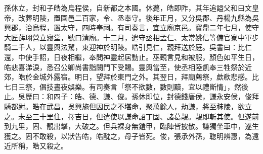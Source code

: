 \begin{pinyinscope}
孫休立，封和子皓為烏程侯，自新都之本國。休薨，皓即阼，其年追謚父和曰文皇帝，改葬明陵，置園邑二百家，令、丞奉守。後年正月，又分吳郡、丹楊九縣為吳興郡，治烏程，置太守，四時奉祠。有司奏言，宜立廟京邑。寶鼎二年七月，使守大匠薛珝營立寢堂，號曰清廟。十二月，遣守丞相孟仁、太常姚信等備官寮中軍步騎二千人，以靈輿法駕，東迎神於明陵。皓引見仁，親拜送於庭。吳書曰：比仁還，中使手詔，日夜相繼，奉問神靈起居動止。巫覡言見和被服，顏色如平生日，皓悲喜涕淚，悉召公卿尚書詣闕門下受賜。靈輿當至，使丞相陸凱奉三牲祭於近郊，皓於金城外露宿。明日，望拜於東門之外。其翌日，拜廟薦祭，歔欷悲感。比七日三祭，倡技晝夜娛樂。有司奏言「祭不欲數，數則黷，宜以禮斷情」，然後止。吳歷曰：和四子：皓、德、謙、俊。孫休即位，封德錢唐侯，謙永安侯，俊拜騎都尉。皓在武昌，吳興施但因民之不堪命，聚萬餘人，劫謙，將至秣陵，欲立之。未至三十里住，擇吉日，但遣使以謙命詔丁固、諸葛靚。靚即斬其使。但遂前到九里，固、靚出擊，大破之。但兵裸身無鎧甲，臨陣皆披散。謙獨坐車中，遂生獲之。固不敢殺，以狀告皓，皓酖之，母子皆死。俊，張承外孫，聦明辨惠，為遠近所稱，皓又殺之。


\end{pinyinscope}